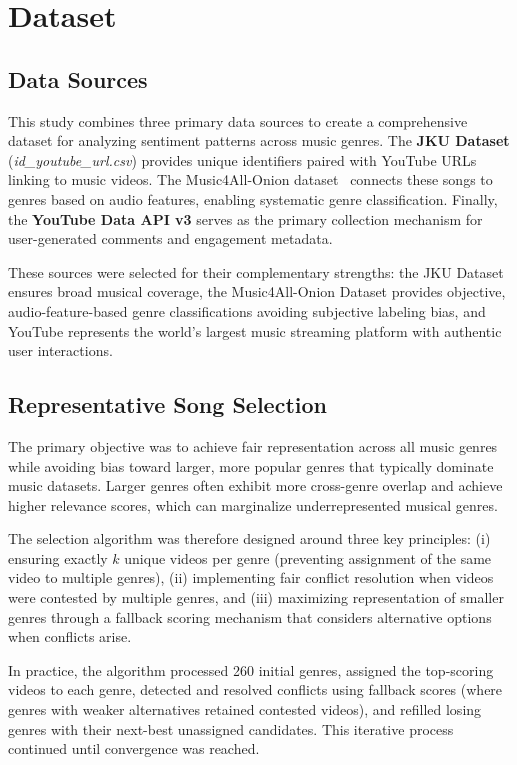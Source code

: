 \chapter{Dataset}

\section{Data Sources}

This study combines three primary data sources to create a comprehensive dataset for analyzing sentiment patterns across music genres. The \textbf{JKU Dataset} (\textit{id\_youtube\_url.csv}) provides unique identifiers paired with YouTube URLs linking to music videos. The Music4All-Onion dataset~\cite{music4all_onion_zenodo_2022} connects these songs to genres based on audio features, enabling systematic genre classification.
Finally, the \textbf{YouTube Data API v3} serves as the primary collection mechanism for user-generated comments and engagement metadata.

These sources were selected for their complementary strengths: the JKU Dataset ensures broad musical coverage, the Music4All-Onion Dataset provides objective, audio-feature-based genre classifications avoiding subjective labeling bias, and YouTube represents the world's largest music streaming platform with authentic user interactions.


\section{Representative Song Selection}

The primary objective was to achieve fair representation across all music genres while avoiding bias toward larger, more popular genres that typically dominate music datasets. Larger genres often exhibit more cross-genre overlap and achieve higher relevance scores, which can marginalize underrepresented musical genres.  

The selection algorithm was therefore designed around three key principles: (i) ensuring exactly $k$ unique videos per genre (preventing assignment of the same video to multiple genres), (ii) implementing fair conflict resolution when videos were contested by multiple genres, and (iii) maximizing representation of smaller genres through a fallback scoring mechanism that considers alternative options when conflicts arise.  

In practice, the algorithm processed 260 initial genres, assigned the top-scoring videos to each genre, detected and resolved conflicts using fallback scores (where genres with weaker alternatives retained contested videos), and refilled losing genres with their next-best unassigned candidates. This iterative process continued until convergence was reached.  

